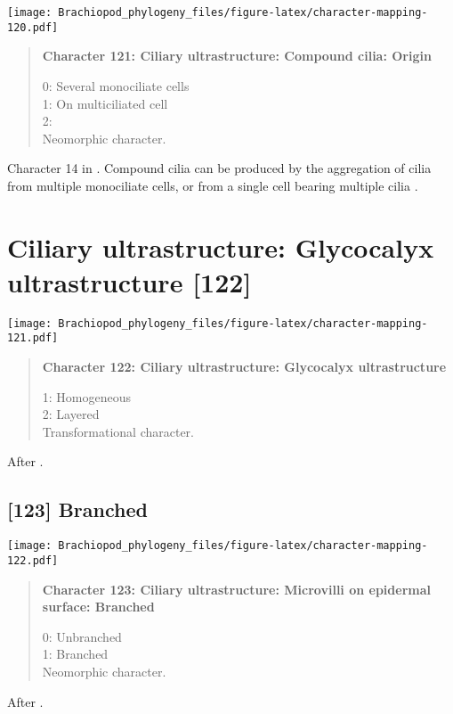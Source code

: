\documentclass[openany]{book}
\theoremstyle{definition}
\theoremstyle{definition}
\theoremstyle{definition}
\theoremstyle{remark}
\begin{document}
\texttt{[image: Brachiopod\_phylogeny\_files/figure-latex/character-mapping-120.pdf]}

\begin{quote}
\textbf{Character 121: Ciliary ultrastructure: Compound cilia: Origin}

0: Several monociliate cells\\
1: On multiciliated cell\\
2:\\
Neomorphic character.
\end{quote}

Character 14 in \citet{Glenner2004}. Compound cilia can be produced by
the aggregation of cilia from multiple monociliate cells, or from a
single cell bearing multiple cilia \citep{Nielsen1987}.

\section{Ciliary ultrastructure: Glycocalyx ultrastructure
{[}122{]}}\label{ciliary-ultrastructure-glycocalyx-ultrastructure-122}

\texttt{[image: Brachiopod\_phylogeny\_files/figure-latex/character-mapping-121.pdf]}

\begin{quote}
\textbf{Character 122: Ciliary ultrastructure: Glycocalyx
ultrastructure}

1: Homogeneous\\
2: Layered\\
Transformational character.
\end{quote}

After \citet{Lundin2009}.

\subsection*{{[}123{]} Branched}\label{branched}

\texttt{[image: Brachiopod\_phylogeny\_files/figure-latex/character-mapping-122.pdf]}

\begin{quote}
\textbf{Character 123: Ciliary ultrastructure: Microvilli on epidermal
surface: Branched}

0: Unbranched\\
1: Branched\\
Neomorphic character.
\end{quote}

After \citet{Lundin2009}.
\end{document}
